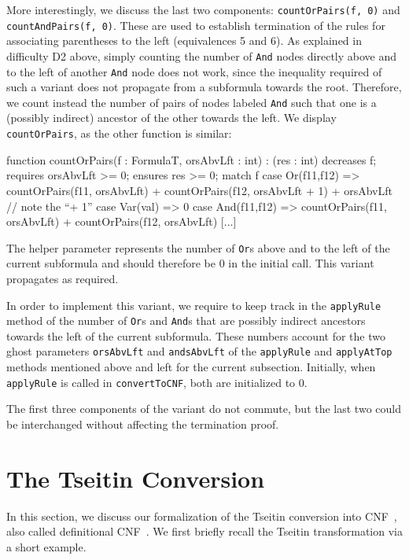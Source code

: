 \documentclass[12pt]{report}
\begin{document}
More interestingly, we discuss the last two components:
\texttt{countOrPairs(f, 0)} and \texttt{countAndPairs(f, 0)}. These
are used to establish termination of the rules for associating
parentheses to the left (equivalences 5 and 6). As explained in
difficulty D2 above, simply counting the number of \texttt{And} nodes
directly above and to the left of another \texttt{And} node does not
work, since the inequality required of such a variant does not
propagate from a subformula towards the root. Therefore, we count
instead the number of pairs of nodes labeled \texttt{And} such that
one is a (possibly indirect) ancestor of the other towards the
left. We display \texttt{countOrPairs}, as the other function is
similar:

\begin{dafny}
function countOrPairs(f : FormulaT, orsAbvLft : int) : (res : int)
  decreases f; requires orsAbvLft >= 0; ensures res >= 0;
{ match f {
    case Or(f11,f12) => countOrPairs(f11, orsAbvLft) +
      countOrPairs(f12, orsAbvLft + 1) + orsAbvLft // note the ``+ 1''
    case Var(val) => 0 
    case And(f11,f12) => countOrPairs(f11, orsAbvLft) +
      countOrPairs(f12, orsAbvLft)
    [...] } }
\end{dafny}

The helper parameter represents the number of \texttt{Or}s above and
to the left of the current subformula and should therefore be \( 0 \)
in the initial call. This variant propagates as required.

In order to implement this variant, we require to keep track in the
\texttt{applyRule} method of the number of \texttt{Or}s and
\texttt{And}s that are possibly indirect ancestors towards the left of
the current subformula. These numbers account for the two ghost
parameters \texttt{orsAbvLft} and \texttt{andsAbvLft} of the
\texttt{applyRule} and \texttt{applyAtTop} methods mentioned above and
left for the current subsection. Initially, when \texttt{applyRule} is
called in \texttt{convertToCNF}, both are initialized to \( 0 \).

The first three components of the variant do not commute, but the last
two could be interchanged without affecting the termination proof.

\section{The Tseitin Conversion}
\label{sec:tseitin}

In this section, we discuss our formalization of the Tseitin
conversion into CNF~\cite{Tseitin}, also called definitional
CNF~\cite{harrison}. We first briefly recall the Tseitin
transformation via a short example.
\end{document}
